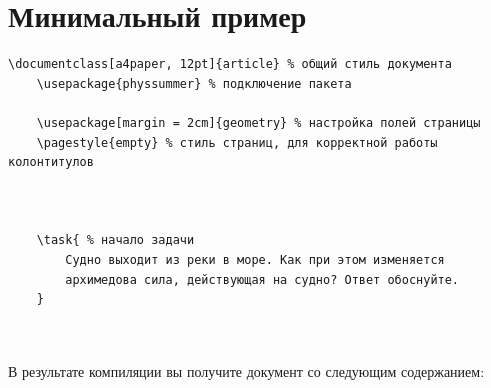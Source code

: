 \section{Минимальный пример}


\begin{lstlisting}[gobble = 3]
    \documentclass[a4paper, 12pt]{article} % общий стиль документа
    \usepackage{physsummer} % подключение пакета

    \usepackage[margin = 2cm]{geometry} % настройка полей страницы
    \pagestyle{empty} % стиль страниц, для корректной работы колонтитулов

    

    \task{ % начало задачи
        Судно выходит из реки в море. Как при этом изменяется
        архимедова сила, действующая на судно? Ответ обоснуйте.
    }

    
\end{lstlisting}

В результате компиляции вы получите документ со следующим содержанием:

\noindent
{}

\vspace{0.5cm}
